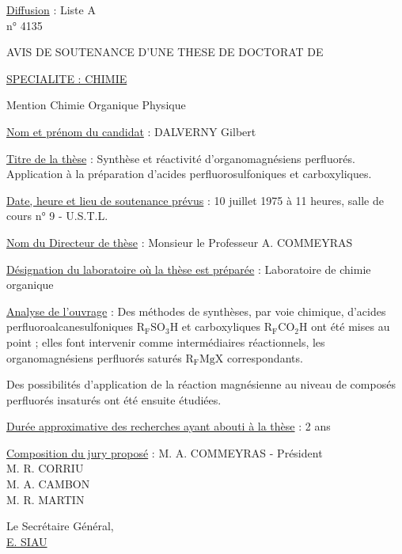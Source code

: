 \uline{Diffusion} : Liste A\\
n° 4135

AVIS DE SOUTENANCE D'UNE THESE DE DOCTORAT DE

\uline{SPECIALITE : CHIMIE}

Mention Chimie Organique Physique

\uline{Nom et prénom du candidat} : DALVERNY Gilbert

\uline{Titre de la thèse} : Synthèse et réactivité d'organomagnésiens perfluorés. Application à la préparation d'acides perfluorosulfoniques et carboxyliques.

\uline{Date, heure et lieu de soutenance prévus} : 10 juillet 1975 à 11 heures, salle de cours n° 9 - U.S.T.L.

\uline{Nom du Directeur de thèse} : Monsieur le Professeur A. COMMEYRAS

\uline{Désignation du laboratoire où la thèse est préparée} : Laboratoire de chimie organique

\uline{Analyse de l'ouvrage} : Des méthodes de synthèses, par voie chimique, d'acides perfluoroalcanesulfoniques $\mathrm{R_FSO_3H}$ et carboxyliques $\mathrm{R_FCO_2H}$ ont été mises au point ; elles font intervenir comme intermédiaires réactionnels, les organomagnésiens perfluorés saturés $\mathrm{R_FMgX}$ correspondants.

Des possibilités d'application de la réaction magnésienne au niveau de composés perfluorés insaturés ont été ensuite étudiées.

\uline{Durée approximative des recherches ayant abouti à la thèse} : 2 ans

\uline{Composition du jury proposé} : M. A. COMMEYRAS - Président\\
M. R. CORRIU\\
M. A. CAMBON\\
M. R. MARTIN

Le Secrétaire Général,\\
\uline{E. SIAU}

